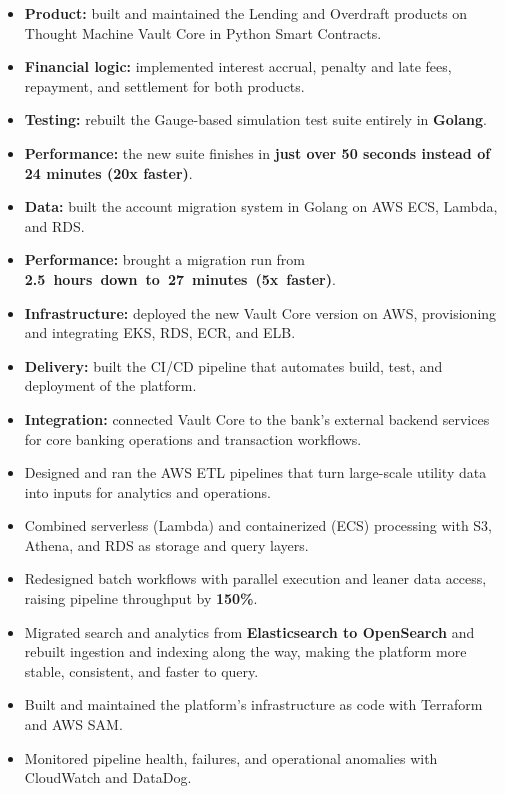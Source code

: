 \jobGalaxyFinX
\begin{itemize}
    \item \textbf{Product:} built and maintained the Lending and Overdraft products on Thought Machine Vault Core in Python Smart Contracts. %
    \item \textbf{Financial logic:} implemented interest accrual, penalty and late fees, repayment, and settlement for both products. %
    \item \textbf{Testing:} rebuilt the Gauge-based simulation test suite entirely in \textbf{Golang}. %
    \item \textbf{Performance:} the new suite finishes in \textbf{just over 50 seconds instead of 24 minutes (20x faster)}. %
    \item \textbf{Data:} built the account migration system in Golang on AWS ECS, Lambda, and RDS. %
    \item \textbf{Performance:} brought a migration run from \mbox{\textbf{2.5 hours down to 27 minutes (5x faster)}}. %
    \item \textbf{Infrastructure:} deployed the new Vault Core version on AWS, provisioning and integrating EKS, RDS, ECR, and ELB. %
    \item \textbf{Delivery:} built the CI/CD pipeline that automates build, test, and deployment of the platform. %
    \item \textbf{Integration:} connected Vault Core to the bank's external backend services for core banking operations and transaction workflows. %
\end{itemize}

\jobVietlink
\begin{itemize}
    \item Designed and ran the AWS ETL pipelines that turn large-scale utility data into inputs for analytics and operations. %
    \item Combined serverless (Lambda) and containerized (ECS) processing with S3, Athena, and RDS as storage and query layers. %
    \item Redesigned batch workflows with parallel execution and leaner data access, raising pipeline throughput by \textbf{150\%}. %
    \item Migrated search and analytics from \textbf{Elasticsearch to OpenSearch} and rebuilt ingestion and indexing along the way, making the platform more stable, consistent, and faster to query. %
    \item Built and maintained the platform's infrastructure as code with Terraform and AWS SAM. %
    \item Monitored pipeline health, failures, and operational anomalies with CloudWatch and DataDog. %
\end{itemize}

